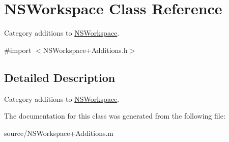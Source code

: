 \hypertarget{class_n_s_workspace}{
\section{NSWorkspace Class Reference}
\label{class_n_s_workspace}
}


Category additions to \hyperlink{class_n_s_workspace}{NSWorkspace}.  


{\ttfamily \#import $<$NSWorkspace+Additions.h$>$}

\subsection{Detailed Description}
Category additions to \hyperlink{class_n_s_workspace}{NSWorkspace}. 

The documentation for this class was generated from the following file:\begin{DoxyCompactItemize}
\item 
source/NSWorkspace+Additions.m\end{DoxyCompactItemize}
